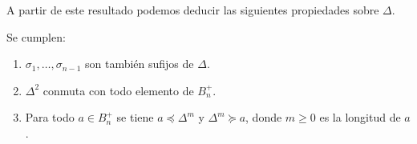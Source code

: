 \documentclass[TFG.tex]{subfiles}
\begin{document}
A partir de este resultado podemos deducir las siguientes propiedades sobre $\Delta$.

\begin{prop} Se cumplen:
\begin{enumerate}
\item $\sigma_1,\dots,\sigma_{n-1}$ son también sufijos de $\Delta$.
\item $\Delta^2$ conmuta con todo elemento de $B_n^+$.
\item Para todo $a\in B_n^+$ se tiene $a\preccurlyeq\Delta^m$ y $\Delta^m\succcurlyeq a$, donde  $m\geq 0$ es la longitud de $a$.
\end{enumerate}
\end{prop}
\end{document}
